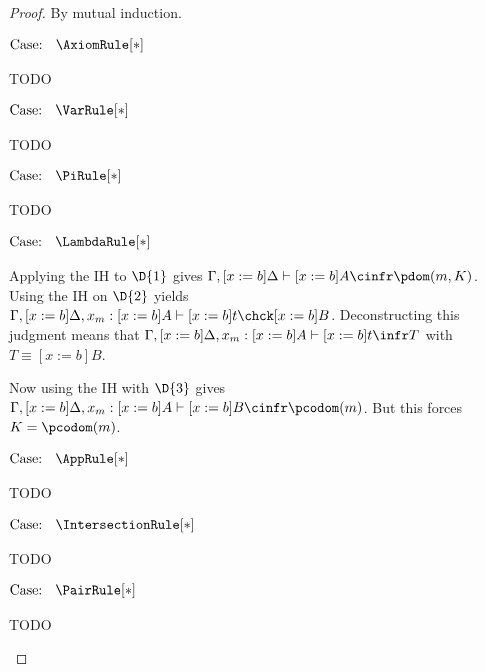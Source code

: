 \begin{proof}
    By mutual induction.

    $\text{Case: }\begin{array}{c} \AxiomRule[*] \end{array}$
    \begin{proofcase}
        TODO
    \end{proofcase}

    $\text{Case: }\begin{array}{c} \VarRule[*] \end{array}$
    \begin{proofcase}
        TODO
    \end{proofcase}

    $\text{Case: }\begin{array}{c} \PiRule[*] \end{array}$
    \begin{proofcase}
        TODO
    \end{proofcase}

    $\text{Case: }\begin{array}{c} \LambdaRule[*] \end{array}$
    \begin{proofcase}
        Applying the IH to $\D{1}$ gives $\Gamma, [x := b]\Delta \vdash [x := b]A \cinfr \pdom(m, K)$.
        Using the IH on $\D{2}$ yields $\Gamma, [x := b]\Delta, x_m : [x := b]A \vdash [x := b]t \chck [x := b]B$.
        Deconstructing this judgment means that $\Gamma, [x := b]\Delta, x_m : [x := b]A \vdash [x := b]t \infr T$ with $T \equiv [x := b]B$.
        
        Now using the IH with $\D{3}$ gives $\Gamma, [x := b]\Delta, x_m : [x := b]A \vdash [x := b]B \cinfr \pcodom(m)$.
        But this forces $K = \pcodom(m)$.
    \end{proofcase}

    $\text{Case: }\begin{array}{c} \AppRule[*] \end{array}$
    \begin{proofcase}
        TODO
    \end{proofcase}

    $\text{Case: }\begin{array}{c} \IntersectionRule[*] \end{array}$
    \begin{proofcase}
        TODO
    \end{proofcase}

    $\text{Case: }\begin{array}{c} \PairRule[*] \end{array}$
    \begin{proofcase}
        TODO
    \end{proofcase}


\end{proof}
